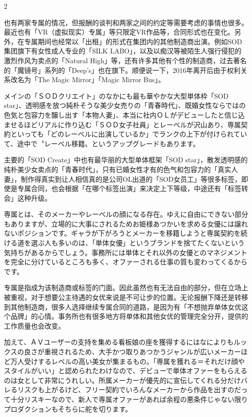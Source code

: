\documentclass[12pt,UTF8]{ctexbook}
\begin{document}
\begin{paracol}{2}
\switchcolumn

也有两家专属的情况，但报酬的谈判和两家之间的约定等需要考虑的事情也很多。最近也有「VR（虚拟现实）专属」等只限定VR作品等，合同形式也在变化。另外，在专属期间也经常以「出租」的形式在集团内的其他制造商出演。例如SOD集团旗下有女性成人专业的「SILK LABO」，以及以痴汉等被陌生人强行侵犯的激烈作风为卖点的「Natural High」等，还有许多其他有个性的制造商，过去著名的「魔镜号」系列的「Deep's」也在旗下。顺便说一下，2016年离开后由于权利关系改名为「The Magic Mirror」「Magic Mirror Bus」。

\switchcolumn*

メインの「ＳＯＤクリエイト」のなかにも最も華やかな大型単体枠「SOD star」、透明感を放つ純朴そうな美少女売りの「青春時代」、既婚女性ならではの色気と包容力を醸し出す「本物人妻」、本当に社内ＯＬがデビューしたと信じ込ませるほどリアルに作り込む「ＳＯＤ女子社員」とレーベルが沢山あり、専属契約といっても「どのレーベルに出演しているか」でランクの上下が付けられていて、途中で〝レーベル移籍〟というアップグレードもあります。

\switchcolumn

主要的「SOD Create」中也有最华丽的大型单体框架「SOD star」，散发透明感的纯朴美少女卖点的「青春时代」，只有已婚女性才有的色气和包容力的「真实人妻」，制作得真实到让人相信真的是公司OL出道的「SOD女员工」等很多标签，即使是专属合同，也会根据「在哪个标签出演」来决定上下等级，中途还有「标签转会」这种升级。

\switchcolumn*
専属とは、そのメーカーやレーベルの顔になる存在。ゆえに自由にできない部分もありますが、立場的に大事にされるためお姫様あつかいを求める女優には譲れないポジションです。ギャラが下がろうとメーカーを移籍しようと専属契約を続ける道を選ぶ人も多いのは、「単体女優」というブランドを捨てたくないという気持ちがあるからでしょう。事務所には単体とそれ以外の女優とのマネジメントを完全に分けているところも多く、オファーされる仕事の質も変わってくるからです。

\switchcolumn

专属是指成为该制造商或标签的门面。因此虽然也有无法自由的部分，但在立场上被重视，对于想要公主待遇的女优来说是不可让步的位置。无论报酬下降还是转移到其他制造商，很多人选择继续专属合同的道路，是因为有「不想抛弃单体女优这个品牌」的心情。事务所也有很多地方将单体和其他女优的管理完全分开，提供的工作质量也会改变。

\switchcolumn*

加えて、ＡＶユーザーの支持を集める看板娘の座を獲得するにはなによりもルックスの良さが重視されるため、大手かつ取りあつかうジャンルが広いメーカーほど万人受けするレベルの高い美女が集まるもの。「専属を獲れる＝それだけ顔やスタイルがいい」と認められたわけなので、デビューで単体オファーをもらえるのは女として非常にうれしい。所属メーカーが優先的に宣伝してくれる分だけバレるリスクも上がるけど、フリー契約でいろんなメーカーから作品を出すのだって十分リスキーなので、新人で専属オファーがあれば余程の悪条件じゃない限りプロダクションもそちらに舵を切ります。


\end{paracol}
\end{document}

